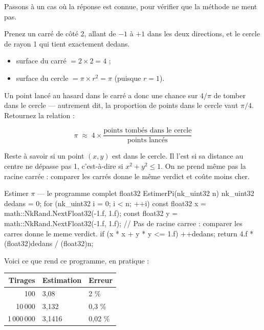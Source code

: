 Passons à un cas où la réponse est connue, pour vérifier que la méthode ne
ment pas.

Prenez un carré de côté 2, allant de $-1$ à $+1$ dans les deux directions, et
le cercle de rayon 1 qui tient exactement dedans.

\begin{itemize}
  \item surface du carré $= 2 \times 2 = 4$ ;
  \item surface du cercle $= \pi \times r^2 = \pi$ (puisque $r = 1$).
\end{itemize}

Un point lancé au hasard dans le carré a donc une chance sur $4/\pi$ de tomber
dans le cercle — autrement dit, la proportion de points dans le cercle vaut
$\pi/4$. Retournez la relation :

\[ \pi \;\approx\; 4 \times \frac{\text{points tombés dans le cercle}}{\text{points lancés}} \]

Reste à savoir si un point $(x, y)$ est dans le cercle. Il l'est si sa distance
au centre ne dépasse pas 1, c'est-à-dire si $x^2 + y^2 \leq 1$. On ne prend
même pas la racine carrée : comparer les carrés donne le même verdict et coûte
moins cher.

\begin{nkcode}{Estimer $\pi$ — le programme complet}
float32 EstimerPi(nk_uint32 n) {
    nk_uint32 dedans = 0;
    for (nk_uint32 i = 0; i < n; ++i) {
        const float32 x = math::NkRand.NextFloat32(-1.f, 1.f);
        const float32 y = math::NkRand.NextFloat32(-1.f, 1.f);
        // Pas de racine carree : comparer les carres donne le meme verdict.
        if (x * x + y * y <= 1.f)
            ++dedans;
    }
    return 4.f * (float32)dedans / (float32)n;
}
\end{nkcode}

Voici ce que rend ce programme, en pratique :

\begin{center}
\begin{tabular}{@{}rll@{}}
\toprule
\textbf{Tirages} & \textbf{Estimation} & \textbf{Erreur} \\
\midrule
100          & 3,08     & 2 \% \\
10\,000      & 3,132    & 0,3 \% \\
1\,000\,000  & 3,1416   & 0,02 \% \\
\bottomrule
\end{tabular}
\end{center}

